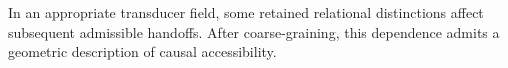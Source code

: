 \setcounter{theorem}{0}
\begin{hypothesis}
In an appropriate transducer field, some retained relational distinctions affect subsequent admissible handoffs. After coarse-graining, this dependence admits a geometric description of causal accessibility.
\end{hypothesis}

